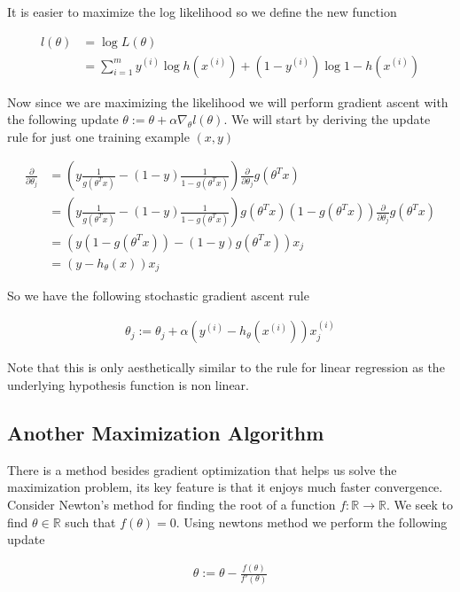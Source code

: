 \documentclass[11pt]{exam}
\newcommand{\idx}[2]{#1^{(#2)}}
\begin{document}
It is easier to maximize the log likelihood so we define the new function

\begin{align*}
l(\theta) &= \log{L(\theta)}\\
          &= \sum_{i=1}^m \idx{y}{i}\log{h(\idx{x}{i})} + (1-\idx{y}{i})\log{1 - h(\idx{x}{i})}
\end{align*}

Now since we are maximizing the likelihood we will perform gradient ascent with the following update $\theta := \theta + \alpha \nabla_\theta l(\theta)$. We will start by deriving the update rule for just one training example $(x,y)$

\begin{align*}
\frac{\partial}{\partial \theta_j} &= (y \frac{1}{g(\theta^Tx)} - (1-y)\frac{1}{1 - g(\theta^Tx)}) \frac{\partial}{\partial \theta_j} g(\theta^Tx)\\
&= (y \frac{1}{g(\theta^Tx)} - (1-y)\frac{1}{1 - g(\theta^Tx)})g(\theta^Tx)(1-g(\theta^Tx)) \frac{\partial}{\partial \theta_j} g(\theta^Tx)\\
&= (y(1-g(\theta^Tx)) - (1-y)g(\theta^Tx))x_j\\
&= (y - h_\theta(x))x_j
\end{align*}

So we have the following stochastic gradient ascent rule

\begin{align*}
\theta_j := \theta_j + \alpha(\idx{y}{i} - h_\theta(\idx{x}{i}))\idx{x}{i}_j
\end{align*}

Note that this is only aesthetically similar to the rule for linear regression as the underlying hypothesis function is non linear.

\subsection{Another Maximization Algorithm}

There is a method besides gradient optimization that helps us solve the maximization problem, its key feature is that it enjoys much faster convergence. Consider Newton's method for finding the root of a function  $f : \mathbb{R} \rightarrow \mathbb{R}$. We seek to find $\theta \in \mathbb{R}$ such that $f(\theta) = 0$. Using newtons method we perform the following update

\begin{align*}
\theta := \theta - \frac{f(\theta)}{f'(\theta)}
\end{align*}
\end{document}
